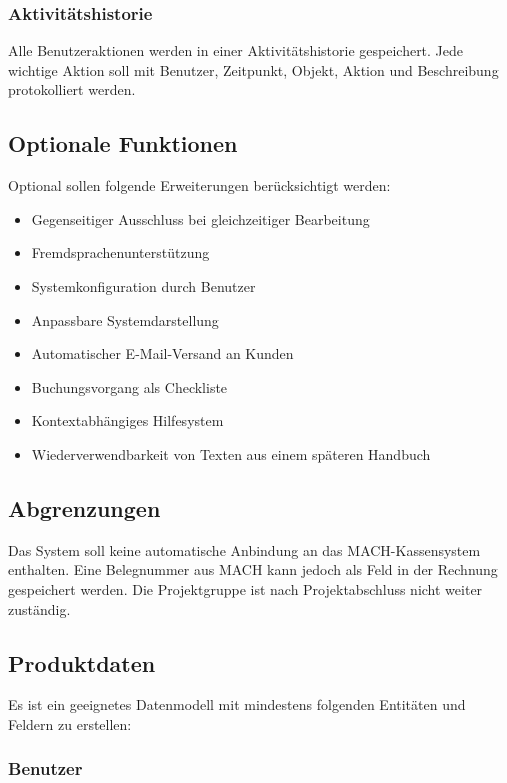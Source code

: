 \subsubsection{Aktivitätshistorie}

Alle Benutzeraktionen werden in einer Aktivitätshistorie gespeichert. Jede wichtige Aktion soll mit Benutzer, Zeitpunkt, Objekt, Aktion und Beschreibung protokolliert werden.

\subsection{Optionale Funktionen}

Optional sollen folgende Erweiterungen berücksichtigt werden:

\begin{itemize}
\item Gegenseitiger Ausschluss bei gleichzeitiger Bearbeitung
\item Fremdsprachenunterstützung
\item Systemkonfiguration durch Benutzer
\item Anpassbare Systemdarstellung
\item Automatischer E-Mail-Versand an Kunden
\item Buchungsvorgang als Checkliste
\item Kontextabhängiges Hilfesystem
\item Wiederverwendbarkeit von Texten aus einem späteren Handbuch
\end{itemize}

\subsection{Abgrenzungen}

Das System soll keine automatische Anbindung an das MACH-Kassensystem enthalten. Eine Belegnummer aus MACH kann jedoch als Feld in der Rechnung gespeichert werden. Die Projektgruppe ist nach Projektabschluss nicht weiter zuständig.

\subsection{Produktdaten}

Es ist ein geeignetes Datenmodell mit mindestens folgenden Entitäten und Feldern zu erstellen:

\subsubsection{Benutzer}

